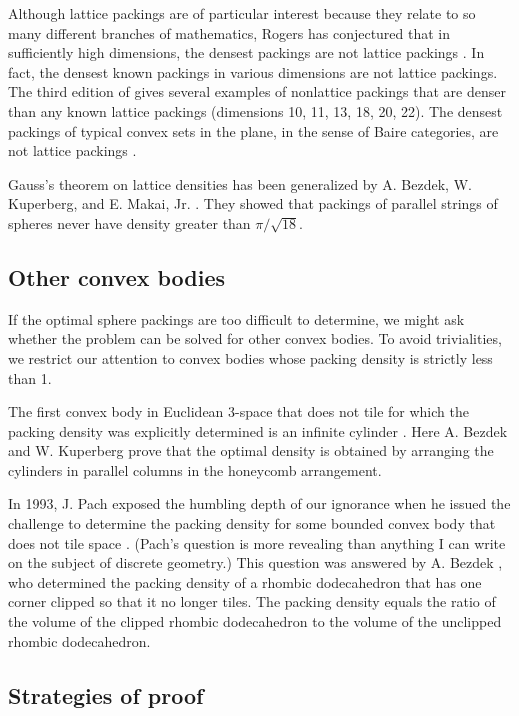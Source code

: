 Although lattice packings are of particular interest because they
relate to so many different branches of mathematics, Rogers has
conjectured that in sufficiently high dimensions, the densest
packings are not lattice packings \cite{Rog64}.   In fact, the
densest known packings in various dimensions are not lattice
packings.  The third edition of \cite{CS} gives several examples
of nonlattice packings that are denser than any known lattice
packings (dimensions 10, 11, 13, 18, 20, 22). The densest packings
of typical convex sets in the plane, in the sense of Baire
categories, are not lattice packings \cite{Fej95}.

Gauss's theorem on lattice densities has been generalized by
A. Bezdek, W. Kuperberg, and E. Makai, Jr. \cite{BKM91}.
They showed that packings of parallel
strings of spheres never have density greater than $\pi/\sqrt{18}$.

\subsection{Other convex bodies}

If the optimal sphere packings are too difficult to determine,
we might ask whether
the problem can be solved for other convex bodies.
To avoid trivialities, we restrict our attention to convex bodies
whose packing density is strictly less than 1.

  The first convex body in Euclidean 3-space that does not tile
for which the packing density was explicitly determined is
an infinite cylinder \cite{Bez90}.
Here A. Bezdek and W. Kuperberg prove
that the
optimal density is obtained by arranging the cylinders in
parallel columns in the honeycomb arrangement.

In 1993, J. Pach exposed the humbling depth of our ignorance when he issued
the challenge to determine the packing density for some bounded convex
body that does not tile space \cite{MP93}.
(Pach's question is more revealing than anything I can write on
the subject of discrete geometry.)
 This question was answered by
A. Bezdek \cite{Bez94}, who determined the packing density of a rhombic
dodecahedron that has one corner clipped so that it no longer tiles.
The packing density equals the ratio of the
volume of the clipped
rhombic dodecahedron to the volume of the unclipped rhombic dodecahedron.

\subsection{Strategies of proof}


